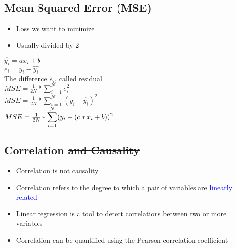 \subsection{Mean Squared Error (MSE)}
\begin{itemize}
    \item Loss we want to minimize
    \item Usually divided by 2
\end{itemize}
\begin{center}
    $\hat{y_i} = ax_i + b$\\
    $e_i = y_i - \hat{y_i}$ \\
    The difference $e_i$, called residual\\
    $MSE = \frac{1}{2N} * \displaystyle\sum_{i = 1}^{N} e_i^2$\\
    $MSE = \frac{1}{2N} * \displaystyle\sum_{i = 1}^{N} (y_i - \hat{y_i})^2$\\
    $MSE = \frac{1}{2N} * \large\displaystyle\sum_{i = 1}^{N}({y_i} - (a*x_i + b))^2$
\end{center}

\subsection{Correlation \sout{and Causality}}
\begin{itemize}
    \item Correlation is not causality
    \item Correlation refers to the degree to which a pair of variables are \textcolor{blue}{linearly related}
    \item Linear regression is a tool to detect correlations between two or more variables
    \item Correlation can be quantified using the Pearson correlation coefficient
\end{itemize}
